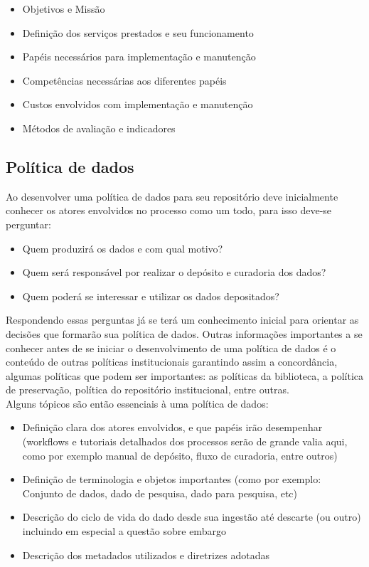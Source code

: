 \documentclass[12pt,hidelinks]{article}
\begin{document}
\begin{itemize}
    \item Objetivos e Missão
    \item Definição dos serviços prestados e seu funcionamento
    \item Papéis necessários para implementação e manutenção
    \item Competências necessárias aos diferentes papéis
    \item Custos envolvidos com implementação e manutenção
    \item Métodos de avaliação e indicadores
\end{itemize}

\subsection{Política de dados}

\qquad Ao desenvolver uma política de dados para seu repositório deve inicialmente \\conhecer os atores envolvidos no processo como um todo, para isso deve-se perguntar:

\begin{itemize}
    \item Quem produzirá os dados e com qual motivo?
    \item Quem será responsável por realizar o depósito e curadoria dos dados?
    \item Quem poderá se interessar e utilizar os dados depositados?
\end{itemize}

Respondendo essas perguntas já se terá um conhecimento inicial para orientar as decisões que formarão sua política de dados. Outras informações importantes a se \\conhecer antes de se iniciar o desenvolvimento de uma política de dados é o conteúdo de outras políticas institucionais garantindo assim a concordância, algumas políticas que podem ser importantes: as políticas da biblioteca, a política de preservação, política do repositório institucional, entre outras.\\

Alguns tópicos são então essenciais à uma política de dados:

\begin{itemize}
    \item Definição clara dos atores envolvidos, e que papéis irão desempenhar (workflows e tutoriais detalhados dos processos serão de grande valia aqui, como por exemplo manual de depósito, fluxo de curadoria, entre outros)
    \item Definição de terminologia  e objetos importantes (como por exemplo: Conjunto de dados, dado de pesquisa, dado para pesquisa, etc)
    \item Descrição do ciclo de vida do dado desde sua ingestão até descarte (ou outro) incluindo em especial a questão sobre embargo
    \item Descrição dos metadados utilizados e diretrizes adotadas
\end{itemize}
\end{document}
